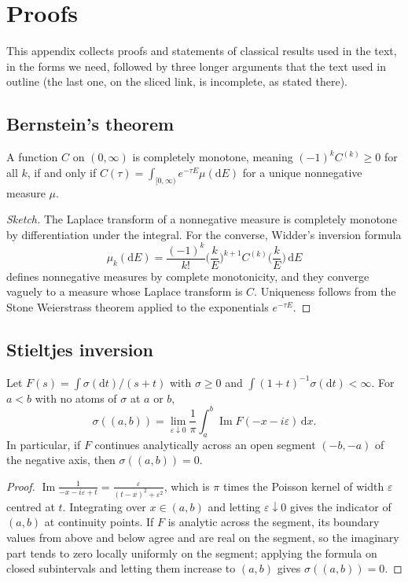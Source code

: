 \chapter{Proofs}\label{ch:aux}

This appendix collects proofs and statements of classical results used in the text, in the forms we need, followed by three longer arguments that the text used in outline (the last one, on the sliced link, is incomplete, as stated there).

\section{Bernstein's theorem}

\begin{theorem}[Bernstein]
A function $C$ on $(0,\infty)$ is completely monotone, meaning $(-1)^kC^{(k)}\ge0$ for all $k$, if and only if $C(\tau)=\int_{[0,\infty)}e^{-\tau E}\mu(\mathrm dE)$ for a unique nonnegative measure $\mu$.
\end{theorem}

\begin{proof}[Sketch]
The Laplace transform of a nonnegative measure is completely monotone by differentiation under the integral. For the converse, Widder's inversion formula
\[
\mu_k(\mathrm dE)=\frac{(-1)^k}{k!}\Big(\frac kE\Big)^{k+1}C^{(k)}\Big(\frac kE\Big)\,\mathrm dE
\]
defines nonnegative measures by complete monotonicity, and they converge vaguely to a measure whose Laplace transform is $C$. Uniqueness follows from the Stone Weierstrass theorem applied to the exponentials $e^{-\tau E}$.
\end{proof}

\section{Stieltjes inversion}

\begin{proposition}
Let $F(s)=\int\sigma(\mathrm dt)/(s+t)$ with $\sigma\ge0$ and $\int(1+t)^{-1}\sigma(\mathrm dt)<\infty$. For $a<b$ with no atoms of $\sigma$ at $a$ or $b$,
\[
\sigma((a,b))=\lim_{\varepsilon\downarrow0}\frac1\pi\int_a^b\operatorname{Im}F(-x-i\varepsilon)\,\mathrm dx .
\]
In particular, if $F$ continues analytically across an open segment $(-b,-a)$ of the negative axis, then $\sigma((a,b))=0$.
\end{proposition}

\begin{proof}
$\operatorname{Im}\frac{1}{-x-i\varepsilon+t}=\frac{\varepsilon}{(t-x)^2+\varepsilon^2}$, which is $\pi$ times the Poisson kernel of width $\varepsilon$ centred at $t$. Integrating over $x\in(a,b)$ and letting $\varepsilon\downarrow0$ gives the indicator of $(a,b)$ at continuity points. If $F$ is analytic across the segment, its boundary values from above and below agree and are real on the segment, so the imaginary part tends to zero locally uniformly on the segment; applying the formula on closed subintervals and letting them increase to $(a,b)$ gives $\sigma((a,b))=0$.
\end{proof}

